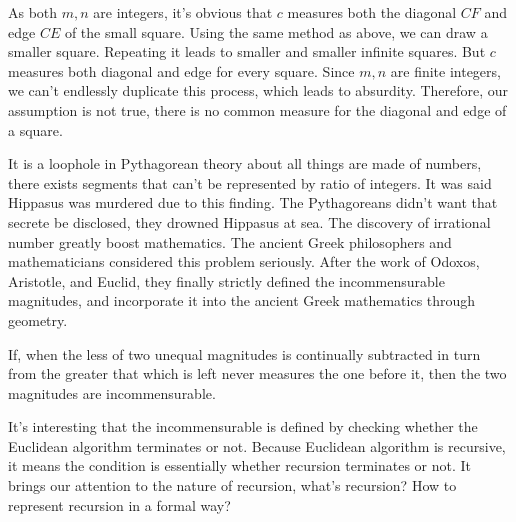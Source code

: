 \documentclass{article}
\begin{document}
As both $m, n$ are integers, it's obvious that $c$ measures both the diagonal $CF$ and edge $CE$ of the small square. Using the same method as above, we can draw a smaller square. Repeating it leads to smaller and smaller infinite squares. But $c$ measures both diagonal and edge for every square. Since $m, n$ are finite integers, we can't endlessly duplicate this process, which leads to absurdity. Therefore, our assumption is not true, there is no common measure for the diagonal and edge of a square.

It is a loophole in Pythagorean theory about all things are made of numbers, there exists segments that can't be represented by ratio of integers. It was said Hippasus was murdered due to this finding. The Pythagoreans didn't want that secrete be disclosed, they drowned Hippasus at sea. The discovery of irrational number greatly boost mathematics. The ancient Greek philosophers and mathematicians considered this problem seriously. After the work of Odoxos, Aristotle, and Euclid, they finally strictly defined the incommensurable magnitudes, and incorporate it into the ancient Greek mathematics through geometry.

\begin{proposition}
If, when the less of two unequal magnitudes is continually subtracted in turn from the greater that which is left never measures the one before it, then the two magnitudes are incommensurable.
\end{proposition}

It's interesting that the incommensurable is defined by checking whether the Euclidean algorithm terminates or not. Because Euclidean algorithm is recursive, it means the condition is essentially whether recursion terminates or not. It brings our attention to the nature of recursion, what's recursion? How to represent recursion in a formal way?

\begin{Exercise}
\end{Exercise}
\end{document}
